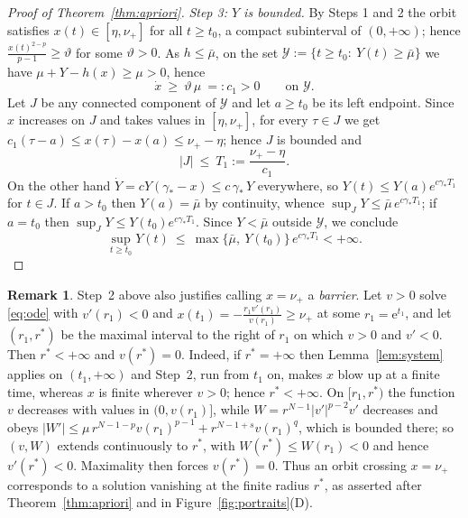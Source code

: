 \documentclass[11pt,reqno]{amsart}
\numberwithin{equation}{section}
\theoremstyle{plain}
\theoremstyle{definition}
\newtheorem{remark}[theorem]{Remark}
\newcommand{\mub}{\bar\mu}
\newcommand{\gs}{\gamma_{*}}
\begin{document}
\begin{proof}[Proof of Theorem~\ref{thm:apriori}]
\smallskip
\noindent\emph{Step 3: $Y$ is bounded.} By Steps 1 and 2 the orbit satisfies
$x(t)\in[\eta,\nu_{+}]$ for all $t\ge t_{0}$, a compact subinterval of
$(0,+\infty)$; hence $\frac{x(t)^{2-p}}{p-1}\ge\vartheta$ for some
$\vartheta>0$. As $h\le\mub$,
on the set $\mathcal Y:=\{t\ge t_{0}:\ Y(t)\ge\mub\}$ we have
$\mu+Y-h(x)\ge\mu>0$, hence
\[
\dot x\ \ge\ \vartheta\,\mu\ =:c_{1}>0\qquad\text{on }\mathcal Y .
\]
Let $J$ be any connected component of $\mathcal Y$ and let $a\ge t_{0}$ be its
left endpoint. Since $x$ increases on $J$ and takes values in
$[\eta,\nu_{+}]$, for every $\tau\in J$ we get
$c_{1}(\tau-a)\le x(\tau)-x(a)\le\nu_{+}-\eta$; hence $J$ is bounded and
\[
|J|\ \le\ T_{1}:=\frac{\nu_{+}-\eta}{c_{1}} .
\]
On the other hand $\dot Y=cY(\gs-x)\le c\,\gs\,Y$ everywhere, so
$Y(t)\le Y(a)e^{c\gs T_{1}}$ for $t\in J$. If $a>t_{0}$ then $Y(a)=\mub$ by
continuity, whence $\sup_{J}Y\le\mub\,e^{c\gs T_{1}}$; if $a=t_{0}$ then
$\sup_{J}Y\le Y(t_{0})e^{c\gs T_{1}}$. Since
$Y<\mub$ outside $\mathcal Y$, we conclude
\[
\sup_{t\ge t_{0}}Y(t)\ \le\
\max\big\{\mub,\ Y(t_{0})\big\}\,e^{c\gs T_{1}}<+\infty .
\]

\end{proof}

\begin{remark}\label{rem:barrier}
Step~2 above also justifies calling $x=\nu_{+}$ a \emph{barrier}. Let $v>0$
solve \eqref{eq:ode} with $v'(r_{1})<0$ and
$x(t_{1})=-\frac{r_{1}v'(r_{1})}{v(r_{1})}\ge\nu_{+}$ at some
$r_{1}=\mathrm e^{t_{1}}$, and let $(r_{1},r^{*})$ be the maximal interval to
the right of $r_{1}$ on which $v>0$ and $v'<0$. Then $r^{*}<+\infty$ and
$v(r^{*})=0$. Indeed, if $r^{*}=+\infty$ then Lemma~\ref{lem:system} applies on
$(t_{1},+\infty)$ and Step~2, run from $t_{1}$ on, makes $x$ blow up at a finite
time, whereas $x$ is finite wherever $v>0$; hence $r^{*}<+\infty$. On
$[r_{1},r^{*})$ the function $v$ decreases with values in $(0,v(r_{1})]$, while
$W=r^{N-1}|v'|^{p-2}v'$ decreases and obeys
$|W'|\le\mu\,r^{N-1-p}v(r_{1})^{p-1}+r^{N-1+s}v(r_{1})^{q}$, which is bounded
there; so $(v,W)$ extends continuously to $r^{*}$, with
$W(r^{*})\le W(r_{1})<0$ and hence $v'(r^{*})<0$. Maximality then forces
$v(r^{*})=0$. Thus an orbit crossing $x=\nu_{+}$ corresponds to a solution
vanishing at the finite radius $r^{*}$, as asserted after
Theorem~\ref{thm:apriori} and in Figure~\ref{fig:portraits}{\rm(D)}.
\end{remark}

\end{document}
